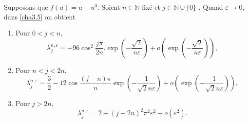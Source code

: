 \documentclass[mathserif,10pt]{beamer}
\begin{document}
 \begin{frame}\transglitter[duration=1]
\begin{theorem}\label{theorem2}
Supposons que $f(u)= u- u^{3}$. Soient $n \in \mathbb{N}$ fixé et $j \in \mathbb{N}\cup \{0\}$ . Quand $\varepsilon \longrightarrow 0$, dans \eqref{cha3.5} on obtient
\begin{enumerate}
\item  Pour $0 < j < n,$ 
$$\lambda_{j}^{n,\varepsilon} = -96 \cos^{2}\frac{j\pi}{2n}. \exp (-\frac{\sqrt{2}}{n\varepsilon}) + o (\exp (-\frac{\sqrt{2}}{n\varepsilon})),$$
\item   Pour $n < j < 2n,$
$$ \lambda_{j}^{n,\varepsilon} = \frac{3}{2} - 12 \cos\frac{(j - n)\pi}{n}\exp (-\frac{1}{\sqrt{2}n\varepsilon}) + o(\exp (-\frac{1}{\sqrt{2}n\varepsilon})),$$
\item  Pour $j > 2n,$
$$  \lambda_{j}^{n,\varepsilon} = 2 + (j -2n)^{2}\pi^{2}\varepsilon^{2} + o(\varepsilon^{2}).$$
\end{enumerate} 
\end{theorem}
\end{frame}
\end{document}
